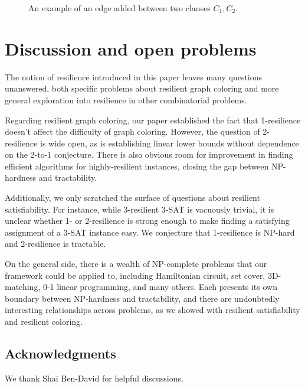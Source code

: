 \documentclass{article}[11pt]  %
\begin{document}
\begin{figure}
\centering
{}
\caption{An example of an edge added between two clauses $C_1, C_2$.}
\label{fig:clause-clause-example}
\end{figure}



\section{Discussion and open problems} \label{sec:open-problems}

The notion of resilience introduced in this paper leaves many questions
unanswered, both specific problems about resilient graph coloring and more
general exploration into resilience in other combinatorial problems. 

Regarding resilient graph coloring, our paper established the fact that
1-resilience doesn't affect the difficulty of graph coloring. However, the
question of 2-resilience is wide open, as is establishing linear lower bounds
without dependence on the 2-to-1 conjecture. There is also obvious room for
improvement in finding efficient algorithms for highly-resilient instances,
closing the gap between NP-hardness and tractability.

Additionally, we only scratched the surface of questions about resilient
satisfiability. For instance, while 3-resilient 3-SAT is vacuously trivial, it
is unclear whether 1- or 2-resilience is strong enough to make finding a
satisfying assignment of a 3-SAT instance easy. We conjecture that 1-resilience
is NP-hard and 2-resilience is tractable.

On the general side, there is a wealth of NP-complete problems that our
framework could be applied to, including Hamiltonian circuit, set cover,
3D-matching, 0-1 linear programming, and many others. Each presents its own
boundary between NP-hardness and tractability, and there are undoubtedly
interesting relationships across problems, as we showed with resilient
satisfiability and resilient coloring.

\subsection*{Acknowledgments}
We thank Shai Ben-David for helpful discussions.




\end{document}
